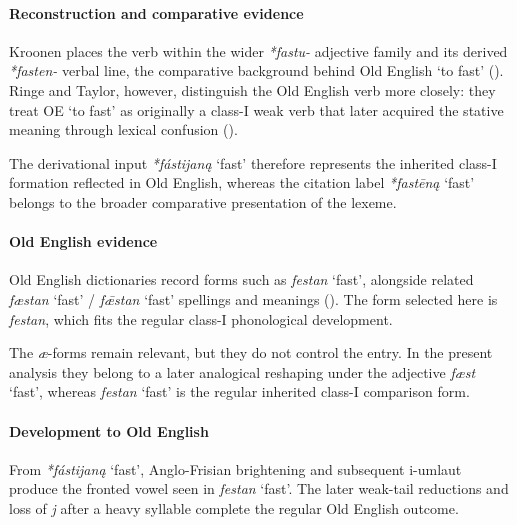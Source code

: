 \documentclass[
  british,
  a4paper,
]{article}
\providecommand{\Recon}[1]{\emph{*#1}}
\begin{document}
\paragraph{Reconstruction and comparative
evidence}\label{reconstruction-and-comparative-evidence-87}

Kroonen places the verb within the wider {\emph{*fastu-}} adjective
family and its derived {\emph{*fasten-}} verbal line, the comparative
background behind Old English `to fast'
(). Ringe and Taylor,
however, distinguish the Old English verb more closely: they treat OE
`to fast' as originally a class-I weak verb that later acquired the
stative meaning through lexical confusion
().

The derivational input \Recon{fástijaną} `fast' therefore represents the
inherited class-I formation reflected in Old English, whereas the
citation label \Recon{fastēną} `fast' belongs to the broader comparative
presentation of the lexeme.

\paragraph{Old English evidence}\label{old-english-evidence-87}

Old English dictionaries record forms such as {\emph{festan}} `fast',
alongside related {\emph{fæstan}} `fast' / {\emph{fǣstan}} `fast'
spellings and meanings (). The form selected here is {\emph{festan}}, which
fits the regular class-I phonological development.

The \emph{æ}-forms remain relevant, but they do not control the entry.
In the present analysis they belong to a later analogical reshaping
under the adjective {\emph{fæst}} `fast', whereas {\emph{festan}} `fast'
is the regular inherited class-I comparison form.

\paragraph{Development to Old
English}\label{development-to-old-english-87}

From \Recon{fástijaną} `fast', Anglo-Frisian brightening and subsequent
i-umlaut produce the fronted vowel seen in {\emph{festan}} `fast'. The
later weak-tail reductions and loss of \emph{j} after a heavy syllable
complete the regular Old English outcome.
\end{document}
